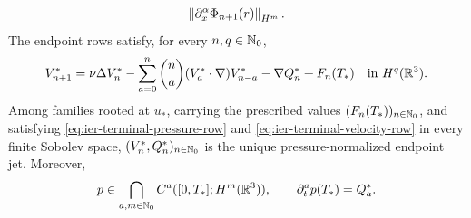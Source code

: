 \begin{theorem}
\begin{align}
 \left\lVert \partial_x^\alpha\Phi_{n+1}(r)\right\rVert_{H^m}.
 \label{eq:ier-terminal-mixed-pressure-modulus}
\end{align}
The endpoint rows satisfy, for every \(n,q\in\mathbb N_0\),
\begin{equation}
 V_{n+1}^*
 =\nu\Delta V_n^*
 -\sum_{a=0}^{n}\binom na(V_a^*\cdot\nabla)V_{n-a}^*
 -\nabla Q_n^*+F_n(T_*)
 \quad\text{in }H^q(\mathbb R^3).
 \label{eq:ier-terminal-velocity-row}
\end{equation}
Among families rooted at \(u_*\), carrying the prescribed values
\((F_n(T_*))_{n\in\mathbb N_0}\), and satisfying
\eqref{eq:ier-terminal-pressure-row} and
\eqref{eq:ier-terminal-velocity-row} in every finite Sobolev space,
\((V_n^*,Q_n^*)_{n\in\mathbb N_0}\) is the unique pressure-normalized endpoint
jet.  Moreover,
\begin{equation}
 p\in\bigcap_{a,m\in\mathbb N_0}C^a([0,T_*];H^m(\mathbb R^3)),
 \qquad
 \partial_t^ap(T_*)=Q_a^*.
 \label{eq:ier-complete-left-pressure-jet}
\end{equation}
\end{theorem}

